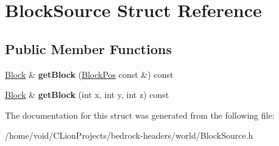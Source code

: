 \hypertarget{struct_block_source}{}\section{Block\+Source Struct Reference}
\label{struct_block_source}
\subsection*{Public Member Functions}
\begin{DoxyCompactItemize}
\item 
\mbox{\label{struct_block_source_a8ff707159086462b6bb42678ed4a653b}} 
\mbox{\hyperlink{struct_block}{Block}} \& {\bfseries get\+Block} (\mbox{\hyperlink{struct_block_pos}{Block\+Pos}} const \&) const
\item 
\mbox{\label{struct_block_source_a9bf45d844d6b88d073111b4da6754af5}} 
\mbox{\hyperlink{struct_block}{Block}} \& {\bfseries get\+Block} (int x, int y, int z) const
\end{DoxyCompactItemize}


The documentation for this struct was generated from the following file\+:\begin{DoxyCompactItemize}
\item 
/home/void/\+C\+Lion\+Projects/bedrock-\/headers/world/Block\+Source.\+h\end{DoxyCompactItemize}
